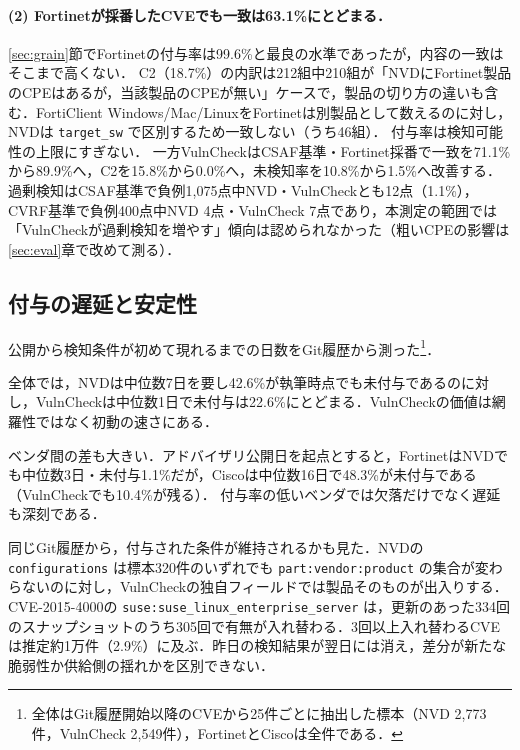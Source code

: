 \paragraph{(2) Fortinetが採番したCVEでも一致は63.1\%にとどまる．}
\ref{sec:grain}節でFortinetの付与率は99.6\%と最良の水準であったが，内容の一致はそこまで高くない．
C2（18.7\%）の内訳は212組中210組が「NVDにFortinet製品のCPEはあるが，当該製品のCPEが無い」ケースで，製品の切り方の違いも含む．FortiClient Windows/Mac/LinuxをFortinetは別製品として数えるのに対し，NVDは \texttt{target\_sw} で区別するため一致しない（うち46組）．
付与率は検知可能性の上限にすぎない．
一方VulnCheckはCSAF基準・Fortinet採番で一致を71.1\%から89.9\%へ，C2を15.8\%から0.0\%へ，未検知率を10.8\%から1.5\%へ改善する．
過剰検知はCSAF基準で負例1,075点中NVD・VulnCheckとも12点（1.1\%），CVRF基準で負例400点中NVD 4点・VulnCheck 7点であり，本測定の範囲では「VulnCheckが過剰検知を増やす」傾向は認められなかった（粗いCPEの影響は\ref{sec:eval}章で改めて測る）．

\subsection{付与の遅延と安定性}
\label{sec:c4}

公開から検知条件が初めて現れるまでの日数をGit履歴から測った\footnote{全体はGit履歴開始以降のCVEから25件ごとに抽出した標本（NVD 2,773件，VulnCheck 2,549件），FortinetとCiscoは全件である．}．

全体では，NVDは中位数7日を要し42.6\%が執筆時点でも未付与であるのに対し，VulnCheckは中位数1日で未付与は22.6\%にとどまる．VulnCheckの価値は網羅性ではなく初動の速さにある．

ベンダ間の差も大きい．アドバイザリ公開日を起点とすると，FortinetはNVDでも中位数3日・未付与1.1\%だが，Ciscoは中位数16日で48.3\%が未付与である（VulnCheckでも10.4\%が残る）．
付与率の低いベンダでは欠落だけでなく遅延も深刻である．

同じGit履歴から，付与された条件が維持されるかも見た．NVDの \texttt{configurations} は標本320件のいずれでも \texttt{part:vendor:product} の集合が変わらないのに対し，VulnCheckの独自フィールドでは製品そのものが出入りする．CVE-2015-4000の \texttt{suse:suse\_linux\_enterprise\_server} は，更新のあった334回のスナップショットのうち305回で有無が入れ替わる．3回以上入れ替わるCVEは推定約1万件（2.9\%）に及ぶ．昨日の検知結果が翌日には消え，差分が新たな脆弱性か供給側の揺れかを区別できない．
